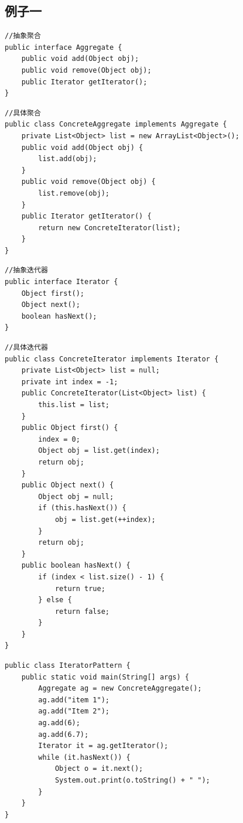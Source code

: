 \subsection{例子一}
\begin{lstlisting}
//抽象聚合
public interface Aggregate {
	public void add(Object obj);
	public void remove(Object obj);
	public Iterator getIterator();
}
\end{lstlisting}
\begin{lstlisting}
//具体聚合
public class ConcreteAggregate implements Aggregate {
	private List<Object> list = new ArrayList<Object>();
	public void add(Object obj) {
		list.add(obj);
	}
	public void remove(Object obj) {
		list.remove(obj);
	}
	public Iterator getIterator() {
		return new ConcreteIterator(list);
	}
}
\end{lstlisting}
\begin{lstlisting}
//抽象迭代器
public interface Iterator {
	Object first();
	Object next();
	boolean hasNext();
}
\end{lstlisting}
\begin{lstlisting}
//具体迭代器
public class ConcreteIterator implements Iterator {
	private List<Object> list = null;
	private int index = -1;
	public ConcreteIterator(List<Object> list) {
		this.list = list;
	}
	public Object first() {
		index = 0;
		Object obj = list.get(index);
		return obj;
	}
	public Object next() {
		Object obj = null;
		if (this.hasNext()) {
			obj = list.get(++index);
		}
		return obj;
	}
	public boolean hasNext() {
		if (index < list.size() - 1) {
			return true;
		} else {
			return false;
		}
	}
}
\end{lstlisting}
\begin{lstlisting}
public class IteratorPattern {
	public static void main(String[] args) {
		Aggregate ag = new ConcreteAggregate();
		ag.add("item 1");
		ag.add("Item 2");
		ag.add(6);
		ag.add(6.7);
		Iterator it = ag.getIterator();
		while (it.hasNext()) {
			Object o = it.next();
			System.out.print(o.toString() + " ");
		}
	}
}
\end{lstlisting}
